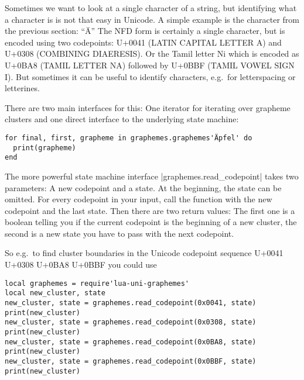 \documentclass{article}
\begin{document}
Sometimes we want to look at a single character of a string, but identifying what a character is is not that easy in Unicode. A simple example is the character from the previous section: ``Ä''
The NFD form is certainly a single character, but is encoded using two codepoints: U+0041 (LATIN CAPITAL LETTER A) and U+0308 (COMBINING DIAERESIS). Or the Tamil letter Ni which is encoded as U+0BA8 (TAMIL LETTER NA) followed by U+0BBF (TAMIL VOWEL SIGN I). But sometimes it can be useful to identify characters, e.g.\ for letterspacing or letterines.

There are two main interfaces for this: One iterator for iterating over grapheme clusters and one direct interface to the underlying state machine:

\begin{verbatim}
for final, first, grapheme in graphemes.graphemes'Äpfel' do
  print(grapheme)
end
\end{verbatim}

\noindent\begingroup
  \ttfamily
  \par
\endgroup

The more powerful state machine interface |graphemes.read_codepoint| takes two parameters: A new codepoint and a state.
At the beginning, the state can be omitted.
For every codepoint in your input, call the function with the new codepoint and the last state. Then there are two return values: The first one is a boolean telling you if the current codepoint is the beginning of a new cluster, the second is a new state you have to pass with the next codepoint.

So e.g.\ to find cluster boundaries in the Unicode codepoint sequence U+0041 U+0308 U+0BA8 U+0BBF you could use

\begin{verbatim}
local graphemes = require'lua-uni-graphemes'
local new_cluster, state
new_cluster, state = graphemes.read_codepoint(0x0041, state)
print(new_cluster)
new_cluster, state = graphemes.read_codepoint(0x0308, state)
print(new_cluster)
new_cluster, state = graphemes.read_codepoint(0x0BA8, state)
print(new_cluster)
new_cluster, state = graphemes.read_codepoint(0x0BBF, state)
print(new_cluster)
\end{verbatim}
  
\end{document}
